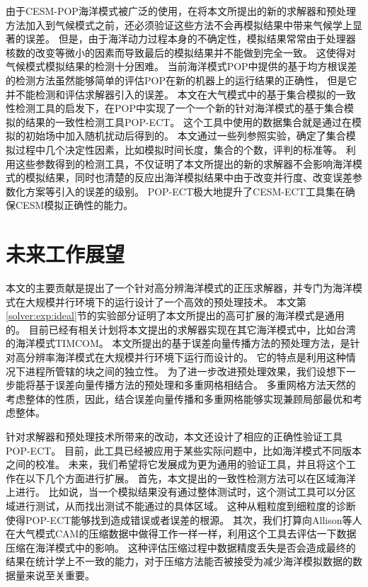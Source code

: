 由于CESM-POP海洋模式被广泛的使用，在将本文所提出的新的求解器和预处理方法加入到气候模式之前，还必须验证这些方法不会再模拟结果中带来气候学上显著的误差。 
但是，由于海洋动力过程本身的不确定性，模拟结果常常由于处理器核数的改变等微小的因素而导致最后的模拟结果并不能做到完全一致。
这使得对气候模式模拟结果的检测十分困难。
当前海洋模式POP中提供的基于均方根误差的检测方法虽然能够简单的评估POP在新的机器上的运行结果的正确性，
但是它并不能检测和评估求解器引入的误差。
本文在大气模式中的基于集合模拟的一致性检测工具的启发下，在POP中实现了一个一个新的针对海洋模式的基于集合模拟的结果的一致性检测工具POP-ECT。
这个工具中使用的数据集合就是通过在模拟的初始场中加入随机扰动后得到的。
本文通过一些列参照实验，确定了集合模拟过程中几个决定性因素，比如模拟时间长度，集合的个数，评判的标准等。
利用这些参数得到的检测工具，不仅证明了本文所提出的新的求解器不会影响海洋模式的模拟结果，同时也清楚的反应出海洋模拟结果中由于改变并行度、改变误差参数化方案等引入的误差的级别。 
POP-ECT极大地提升了CESM-ECT工具集在确保CESM模拟正确性的能力。


 
\section{未来工作展望}
\label{sec:futurework}

本文的主要贡献是提出了一个针对高分辨海洋模式的正压求解器，并专门为海洋模式在大规模并行环境下的运行设计了一个高效的预处理技术。
本文第\ref{solver:exp:ideal}节的实验部分证明了本文所提出的高可扩展的海洋模式是通用的。
目前已经有相关计划将本文提出的求解器实现在其它海洋模式中，比如台湾的海洋模式TIMCOM\cite{tseng2011parallel}。 
本文所提出的基于误差向量传播方法的预处理方法，是针对高分辨率海洋模式在大规模并行环境下运行而设计的。
它的特点是利用这种情况下进程所管辖的块之间的独立性。 为了进一步改进预处理效果，我们设想下一步能将基于误差向量传播方法的预处理和多重网格相结合。 
多重网格方法天然的考虑整体的性质，因此，结合误差向量传播和多重网格能够实现兼顾局部最优和考虑整体。


针对求解器和预处理技术所带来的改动，本文还设计了相应的正确性验证工具POP-ECT。
目前，此工具已经被应用于某些实际问题中，比如海洋模式不同版本之间的校准。
未来，我们希望将它发展成为更为通用的验证工具，并且将这个工作在以下几个方面进行扩展。 
首先，本文提出的一致性检测方法可以在区域海洋上进行。
比如说，当一个模拟结果没有通过整体测试时，这个测试工具可以分区域进行测试，从而找出测试不能通过的具体区域。 
这种从粗粒度到细粒度的诊断使得POP-ECT能够找到造成错误或者误差的根源。 
其次，我们打算向Allison等人在大气模式CAM的压缩数据中做得工作一样\cite{baker2014methodology}一样，利用这个工具去评估一下数据压缩在海洋模式中的影响。
这种评估压缩过程中数据精度丢失是否会造成最终的结果在统计学上不一致的能力，对于压缩方法能否被接受为减少海洋模拟数据的数据量来说至关重要。 



